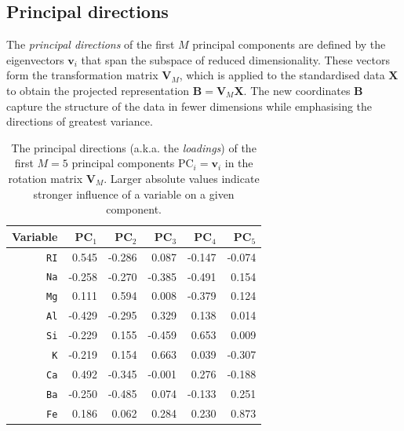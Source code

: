 \documentclass[dtu]{dtuarticle}
\begin{document}
	\subsection{Principal directions}

	The \textit{principal directions} of the first $M$ principal components are defined by the eigenvectors $\bm{v}_i$ that span the subspace of reduced dimensionality. These vectors form the transformation matrix $\bm{V}_M$, which is applied to the standardised data $\bm{X}$ to obtain the projected representation $\bm{B} = \bm{V}_M \bm{X}$. The new coordinates $\bm{B}$ capture the structure of the data in fewer dimensions while emphasising the directions of greatest variance.

	\begin{table}
		\centering
		\begin{tabular}{r | *{5}{|r}}
			\textbf{Variable} & $\textbf{PC}_1$ & $\textbf{PC}_2$ & $\textbf{PC}_3$ & $\textbf{PC}_4$ & $\textbf{PC}_5$ \\ \hline\hline
			\texttt{RI} & \num{0.545}     &          -0.286 &           0.087 &          -0.147 &          -0.074 \\
			\texttt{Na} & -0.258          &          -0.270 &          -0.385 &          -0.491 &           0.154 \\
			\texttt{Mg} & 0.111           &           0.594 &           0.008 &          -0.379 &           0.124 \\
			\texttt{Al} & -0.429          &          -0.295 &           0.329 &           0.138 &           0.014 \\
			\texttt{Si} & -0.229          &           0.155 &          -0.459 &           0.653 &           0.009 \\
			\texttt{K} & -0.219          &           0.154 &           0.663 &           0.039 &          -0.307 \\
			\texttt{Ca} & 0.492           &          -0.345 &          -0.001 &           0.276 &          -0.188 \\
			\texttt{Ba} & -0.250          &          -0.485 &           0.074 &          -0.133 &           0.251 \\
			\texttt{Fe} & 0.186           &           0.062 &           0.284 &           0.230 &           0.873
		\end{tabular}
		\caption{The principal directions (a.k.a. the \textit{loadings}) of the first $M=5$ principal components $\text{PC}_i = \bm{v}_i$ in the rotation matrix $\bm{V}_M$. Larger absolute values indicate stronger influence of a variable on a given component.}
		\label{table:loadings}
	\end{table}
\end{document}
